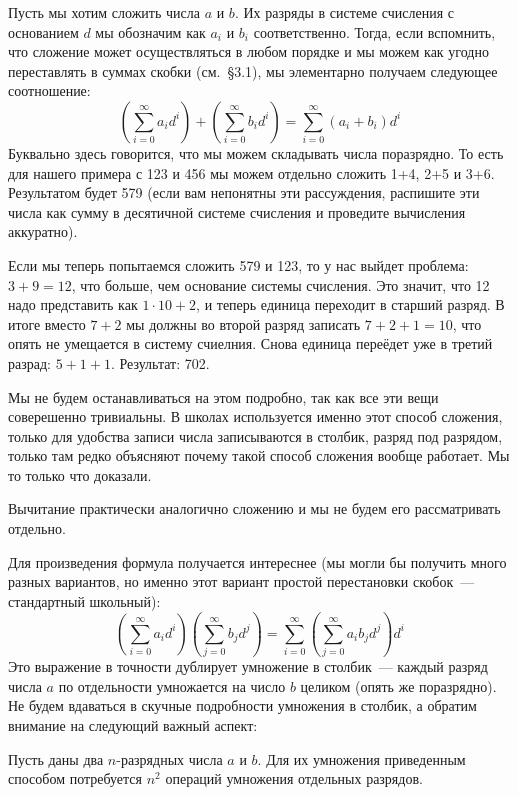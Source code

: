 Пусть мы хотим сложить числа $a$ и $b$. Их разряды в системе счисления с основанием $d$ мы обозначим как $a_i$ и $b_i$ соответственно. Тогда, если вспомнить, что сложение может осуществляться в любом порядке и мы можем как угодно переставлять в суммах скобки (см.~\S3.1), мы элементарно получаем следующее соотношение:
$$\left(\sum_{i=0}^\infty a_i d^i\right) + \left(\sum_{i=0}^\infty b_i d^i\right) = \sum_{i=0}^\infty (a_i + b_i) d^i$$
Буквально здесь говорится, что мы можем складывать числа поразрядно. То есть для нашего примера с 123 и 456 мы можем отдельно сложить 1+4, 2+5 и 3+6. Результатом будет 579 (если вам непонятны эти рассуждения, распишите эти числа как сумму в десятичной системе счисления и проведите вычисления аккуратно).

Если мы теперь попытаемся сложить 579 и 123, то у нас выйдет проблема: $3+9=12$, что больше, чем основание системы счисления. Это значит, что 12 надо представить как $1\cdot10 + 2$, и теперь единица переходит в старший разряд. В итоге вместо $7+2$ мы должны во второй разряд записать $7+2+1=10$, что опять не умещается в систему счиелния. Снова единица переёдет уже в третий разрад: $5+1+1$. Результат: 702.

Мы не будем останавливаться на этом подробно, так как все эти вещи соверешенно тривиальны. В школах используется именно этот способ сложения, только для удобства записи числа записываются в столбик, разряд под разрядом, только там редко объясняют почему такой способ сложения вообще работает. Мы то только что доказали.

Вычитание практически аналогично сложению и мы не будем его рассматривать отдельно.

Для произведения формула получается интереснее (мы могли бы получить много разных вариантов, но именно этот вариант простой перестановки скобок~--- стандартный школьный):
$$\left(\sum_{i=0}^\infty a_i d^i \right)\left( \sum_{j=0}^\infty b_j d^j \right) = \sum_{i=0}^\infty \left(\sum_{j=0}^\infty a_i b_j d^j \right)d^i$$
Это выражение в точности дублирует умножение в столбик~--- каждый разряд числа $a$ по отдельности умножается на число $b$ целиком (опять же поразрядно). Не будем вдаваться в скучные подробности умножения в столбик, а обратим внимание на следующий важный аспект:

\begin{exercise}
Пусть даны два $n$-разрядных числа $a$ и $b$. Для их умножения приведенным способом потребуется $n^2$ операций умножения отдельных разрядов.
\end{exercise}

